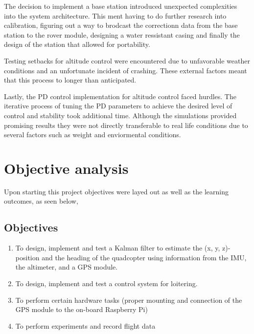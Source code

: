 \documentclass{report}
\begin{document}
The decision to implement a base station introduced unexpected complexities into
the system architecture. This ment having to do further research into
calibration, figuring out a way to brodcast the correctionn data from the base
station to the rover module, designing a water ressistant casing and finally the
design of the station that allowed for portability. 

Testing setbacks for altitude control were encountered due to unfavorable
weather conditions and an unfortunate incident of crashing. These external
factors meant that this process to longer than anticipated.

Lastly, the PD control implementation for altitude control faced hurdles. The
iterative process of tuning the PD parameters to achieve the desired level of
control and stability took additional time. Although the simulations provided
promising results they were not directly transferable to real life conditions
due to several factors such as weight and enviormental conditions.

\section{Objective analysis}
Upon starting this project objectives were layed out as well as the learning
outcomes, as seen below, 
\subsection*{Objectives}
\begin{enumerate}
  \item To design, implement and test a Kalman filter to estimate the (x, y, z)-
  position and the heading of the quadcopter using information from the IMU, the
  altimeter, and a GPS module.
  \item To design, implement and test a control system for loitering.
  \item To perform certain hardware tasks (proper mounting and connection of the
  GPS module to the on-board Raspberry Pi)
  \item To perform experiments and record flight data
\end{enumerate}
\end{document}
